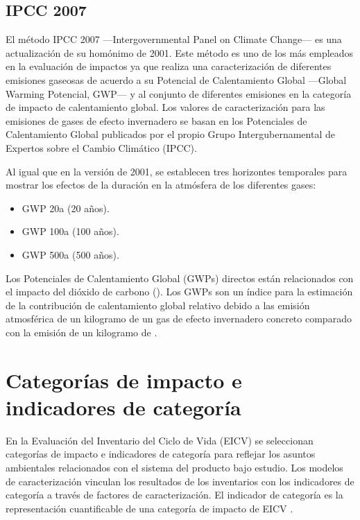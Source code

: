 \subsection{IPCC 2007}

El método IPCC 2007 —Intergovernmental Panel on Climate Change— es una actualización de su homónimo de 2001. Este método es uno de los más empleados en la evaluación de impactos ya que realiza una caracterización de diferentes emisiones gaseosas de acuerdo a su Potencial de Calentamiento Global —Global Warming Potencial, GWP— y al conjunto de diferentes emisiones en la categoría de impacto de calentamiento global. Los valores de caracterización para las emisiones de gases de efecto invernadero se basan en los Potenciales de Calentamiento Global publicados por el propio Grupo Intergubernamental de Expertos sobre el Cambio Climático (IPCC).

Al igual que en la versión de 2001, se establecen tres horizontes temporales para mostrar los efectos de la duración en la atmósfera de los diferentes gases:
\begin{itemize}
  \item GWP 20a (20 años).
  \item GWP 100a (100 años).
  \item GWP 500a (500 años).
\end{itemize}

Los Potenciales de Calentamiento Global (GWPs) directos están relacionados con el impacto del dióxido de carbono (). Los GWPs son un índice para la estimación de la contribución de calentamiento global relativo debido a las emisión atmosférica de un kilogramo de un gas de efecto invernadero concreto comparado con la emisión de un kilogramo de  \cite{ecoinventlcia}.

\section{Categorías de impacto e indicadores de categoría}\label{sec:catimpactos}

En la Evaluación del Inventario del Ciclo de Vida (EICV) se seleccionan categorías de impacto e indicadores de categoría para reflejar los asuntos ambientales relacionados con el sistema del producto bajo estudio. Los modelos de caracterización vinculan los resultados de los inventarios con los indicadores de categoría a través de factores de caracterización. El indicador de categoría es la representación cuantificable de una categoría de impacto de EICV \cite{niembro}.

